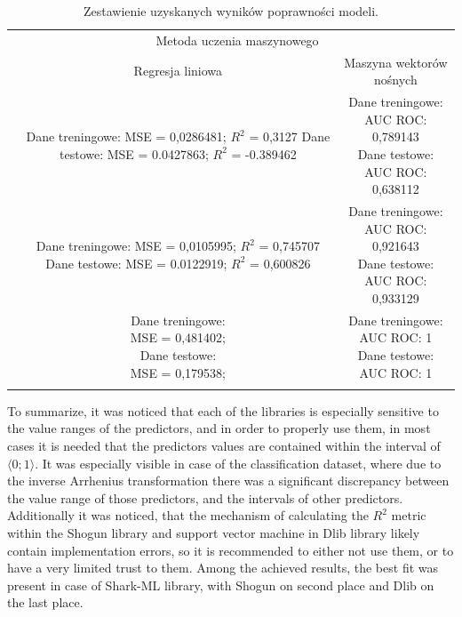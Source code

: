 \begin{longtable}{c | c | c }
	\centering
	\multirow{2}{*}{\makecell{Biblioteka}} & \multicolumn{2}{c}{Metoda uczenia maszynowego} \\
	\cline{2-3}
	& Regresja liniowa & Maszyna wektorów nośnych \\
	\hline
	\makecell{Shogun} & \makecell{Dane treningowe: \\ MSE = 0,0286481; $R^2$ = 0,3127 \\ Dane testowe: \\ MSE = 0.0427863; $R^2$ = -0.389462} & \makecell{Dane treningowe: \\ AUC ROC: 0,789143 \\ Dane testowe: \\ AUC ROC: 0,638112} \\
	\hline
	\makecell{Shark} & \makecell{Dane treningowe: \\ MSE = 0,0105995; $R^2$ = 0,745707 \\ Dane testowe: \\ MSE = 0.0122919; $R^2$ = 0,600826} & \makecell{Dane treningowe: \\ AUC ROC: 0,921643 \\ Dane testowe: \\ AUC ROC: 0,933129} \\
	\hline
	\makecell{Dlib} & \makecell{Dane treningowe: \\ MSE = 0,481402; \\ Dane testowe: \\ MSE = 0,179538; } & \makecell{Dane treningowe: \\ AUC ROC: 1 \\ Dane testowe: \\ AUC ROC: 1} \\
	\caption{Zestawienie uzyskanych wyników poprawności modeli.}
	\label{tab:models2}
\end{longtable} 

To summarize, it was noticed that each of the libraries is especially sensitive to the value ranges of the predictors, and in order to properly use them, in most cases it is needed that the predictors values are contained within the interval of $\langle0; 1\rangle$. It was especially visible in case of the classification dataset, where due to the inverse Arrhenius transformation there was a significant discrepancy between the value range of those predictors, and the intervals of other predictors. Additionally it was noticed, that the mechanism of calculating the $R^2$ metric within the Shogun library and support vector machine in Dlib library likely contain implementation errors, so it is recommended to either not use them, or to have a very limited trust to them. Among the achieved results, the best fit was present in case of Shark-ML library, with Shogun on second place and Dlib on the last place.

